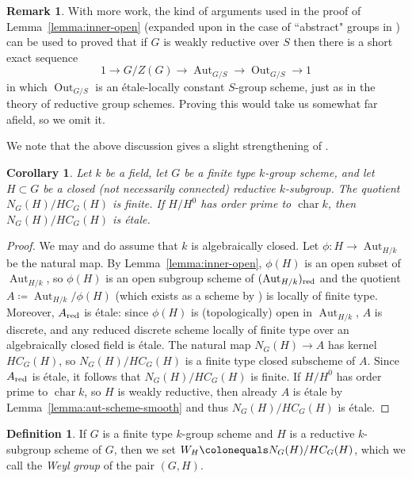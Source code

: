 \documentclass[11pt, letterpaper,english]{amsart}
\theoremstyle{plain}
\newtheorem{corollary}[lem]{Corollary}
\theoremstyle{definition}
\newtheorem{defn}[lem]{Definition}
\newtheorem{remark}[lem]{Remark}
\numberwithin{equation}{section}
\numberwithin{lem}{section}
\DeclareMathOperator{\Aut}{Aut}
\DeclareMathOperator{\chara} {char}
\DeclareMathOperator{\Out}{Out}
\begin{document}
\begin{remark}
With more work, the kind of arguments used in the proof of Lemma~\ref{lemma:inner-open} (expanded upon in the case of ``abstract" groups in \cite{Extensions}) can be used to proved that if $G$ is weakly reductive over $S$ then there is a short exact sequence 
\[
1 \to G/Z(G) \to \Aut_{G/S} \to \Out_{G/S} \to 1
\]
in which $\Out_{G/S}$ is an \'{e}tale-locally constant $S$-group scheme, just as in the theory of reductive group schemes. Proving this would take us somewhat far afield, so we omit it.
\end{remark}

We note that the above discussion gives a slight strengthening of \cite[Lemma 6.8]{martin03}.

\begin{corollary} \label{cor:finiteness of weyl}
Let $k$ be a field, let $G$ be a finite type $k$-group scheme, and let $H \subset G$ be a closed (not necessarily connected) reductive $k$-subgroup. The quotient $N_G(H)/HC_G(H)$ is finite. If $H/H^0$ has order prime to $\chara k$, then $N_G(H)/HC_G(H)$ is \'{e}tale.
\end{corollary}

\begin{proof}
We may and do assume that $k$ is algebraically closed. Let $\phi: H \to \Aut_{H/k}$ be the natural map. By Lemma~\ref{lemma:inner-open}, $\phi(H)$ is an open subset of $\Aut_{H/k}$, so $\phi(H)$ is an open subgroup scheme of $(\Aut_{H/k})_{\rm{red}}$ and the quotient $A \coloneqq \Aut_{H/k}/\phi(H)$ (which exists as a scheme by \cite[Exp.\ VI\textsubscript{A}, Th\'eor\`eme 3.2]{sga3}) is locally of finite type. Moreover, $A_{\rm{red}}$ is \'etale: since $\phi(H)$ is (topologically) open in $\Aut_{H/k}$, $A$ is discrete, and any reduced discrete scheme locally of finite type over an algebraically closed field is \'{e}tale. The natural map $N_G(H) \to A$ has kernel $HC_G(H)$, so $N_G(H)/HC_G(H)$ is a finite type closed subscheme of $A$. Since $A_{\rm{red}}$ is \'{e}tale, it follows that $N_G(H)/HC_G(H)$ is finite. If $H/H^0$ has order prime to $\chara k$, so $H$ is weakly reductive, then already $A$ is \'{e}tale by Lemma~\ref{lemma:aut-scheme-smooth} and thus $N_G(H)/HC_G(H)$ is \'{e}tale.
\end{proof}

\begin{defn}
If $G$ is a finite type $k$-group scheme and $H$ is a reductive $k$-subgroup scheme of $G$, then we set $W_H \colonequals N_G(H)/HC_G(H)$, which we call the \textit{Weyl group} of the pair $(G, H)$.
\end{defn} 
\end{document}
